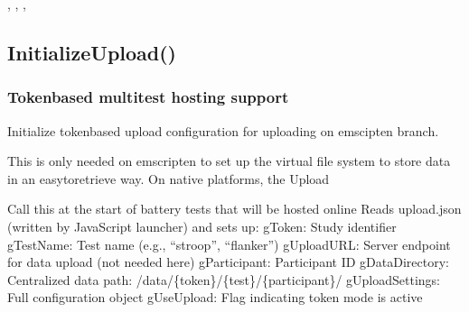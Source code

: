\documentclass[letterpaper,10pt,english]{sphinxmanual}
\begin{document}
\sphinxAtStartPar
{}

\sphinxAtStartPar
{}, , , 

\ignorespaces 

\subsection{InitializeUpload()}
\label{\detokenize{reference/utility:initializeupload}}\label{\detokenize{reference/utility:index-20}}
\sphinxAtStartPar
{}


\subsubsection{Token\sphinxhyphen{}based multi\sphinxhyphen{}test hosting support}
\label{\detokenize{reference/utility:token-based-multi-test-hosting-support}}
\sphinxAtStartPar
Initialize token\sphinxhyphen{}based upload configuration for uploading on emscipten branch.

\sphinxAtStartPar
This is only needed on emscripten to set up the virtual file system to store data
in an easy\sphinxhyphen{}to\sphinxhyphen{}retrieve way.  On native platforms, the Upload

\sphinxAtStartPar
Call this at the start of battery tests that will be hosted online
Reads upload.json (written by JavaScript launcher) and sets up:
\sphinxhyphen{} gToken: Study identifier
\sphinxhyphen{} gTestName: Test name (e.g., “stroop”, “flanker”)
\sphinxhyphen{} gUploadURL: Server endpoint for data upload (not needed here)
\sphinxhyphen{} gParticipant: Participant ID
\sphinxhyphen{} gDataDirectory: Centralized data path: /data/\{token\}/\{test\}/\{participant\}/
\sphinxhyphen{} gUploadSettings: Full configuration object
\sphinxhyphen{} gUseUpload: Flag indicating token mode is active

\sphinxAtStartPar
{}

\begin{sphinxVerbatim}[commandchars=\\\{\}]
\end{sphinxVerbatim}
\end{document}
